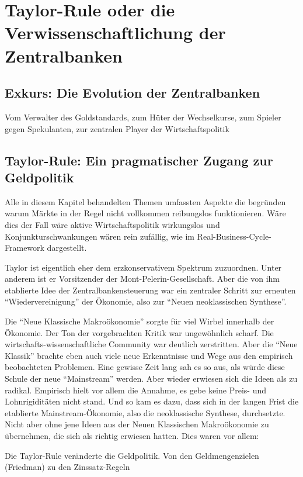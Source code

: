 \section{Taylor-Rule oder die Verwissenschaftlichung der Zentralbanken}



\subsection{Exkurs: Die Evolution der Zentralbanken}
Vom Verwalter des Goldstandards, zum Hüter der Wechselkurse, zum Spieler gegen Spekulanten, zur zentralen Player der Wirtschaftspolitik

\subsection{Taylor-Rule: Ein pragmatischer Zugang zur Geldpolitik}
Alle  in diesem Kapitel behandelten Themen umfassten Aspekte die begründen warum Märkte in der Regel nicht vollkommen reibungslos funktionieren. Wäre dies der Fall wäre aktive Wirtschaftspolitik wirkungslos und Konjunkturschwankungen wären rein zufällig, wie im Real-Business-Cycle-Framework dargestellt.
\textcite[S. 823]{Akerlof1985}

Taylor ist eigentlich eher dem erzkonservativem Spektrum zuzuordnen. Unter anderem ist er Vorsitzender der Mont-Pelerin-Gesellschaft. Aber die von ihm etablierte Idee der Zentralbankensteuerung war ein zentraler Schritt zur erneuten "`Wiedervereinigung"' der Ökonomie, also zur "`Neuen neoklassischen Synthese"'.

Die "`Neue Klassische Makroökonomie"' sorgte für viel Wirbel innerhalb der Ökonomie. Der Ton der vorgebrachten Kritik war ungewöhnlich scharf. Die wirtschafts-wissenschaftliche Community war deutlich zerstritten. Aber die "`Neue Klassik"' brachte eben auch viele neue Erkenntnisse und Wege aus den empirisch beobachteten Problemen. Eine gewisse Zeit lang sah es so aus, als würde diese Schule der neue "`Mainstream"' werden. Aber wieder erwiesen sich die Ideen als zu radikal. Empirisch hielt vor allem die Annahme, es gebe keine Preis- und Lohnrigiditäten nicht stand.
Und so kam es dazu, dass sich in der langen Frist die etablierte Mainstream-Ökonomie, also die neoklassische Synthese, durchsetzte. Nicht aber ohne jene Ideen aus der Neuen Klassischen Makroökonomie zu übernehmen, die sich als richtig erwiesen hatten. Dies waren vor allem:

Die Taylor-Rule veränderte die Geldpolitik. Von den Geldmengenzielen (Friedman) zu den Zinssatz-Regeln \parencite[S. 36]{Gali2007}



















